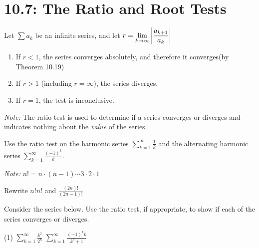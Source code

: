 \documentclass[../mathNotesPreamble]{subfiles}
\begin{document}
  \section{10.7: The Ratio and Root Tests}

  \begin{thmBox*}
    Let $\sum a_k$ be an infinite series, and let $\displaystyle r=\lim_{k\to \infty}{\left\vert\frac{a_{k+1}}{a_k}\right\vert}$
    \begin{enumerate}
      \item If $r<1$, the series converges absolutely, and therefore it converges\newline (by Theorem 10.19)
      \item If $r>1$ (including $r=\infty$), the series diverges.
      \item If $r=1$, the test is inconclusive.
    \end{enumerate}
  \end{thmBox*}
  \noindent\textit{Note:} The ratio test is used to determine if a series converges or diverges and indicates nothing about the \textit{value} of the series.
  \begin{ex*}
    Use the ratio test on the harmonic series $\displaystyle\sum_{k=1}^\infty \frac{1}{k}$ and the alternating harmonic series $\displaystyle\sum_{k=1}^\infty \frac{(-1)^k}{k}$.
  \end{ex*}
  \pagebreak

  \begin{ex*}
    \textit{Note:} $n!=n\cdot(n-1)\cdots3\cdot2\cdot1$\newline
  \end{ex*}
  \vspace*{-\baselineskip}
  \noindent
  Rewrite $n!n!$  and $\displaystyle\frac{(2n)!}{(2n-1)!}$ 
  \vspace*{\baselineskip}

  \begin{ex*}
    Consider the series below. Use the ratio test, if appropriate, to show if each of the series converges or diverges.
  \end{ex*}
  \begin{tasks}[after-item-skip=\stretch{1}, label=,item-indent=0pt](1)
    \task $\displaystyle\sum_{k=1}^\infty \frac{k^2}{2^k}$
    \task $\displaystyle\sum_{k=1}^\infty \frac{(-1)^k k}{k^3+1}$
  \end{tasks}
  \pagebreak
\end{document}
